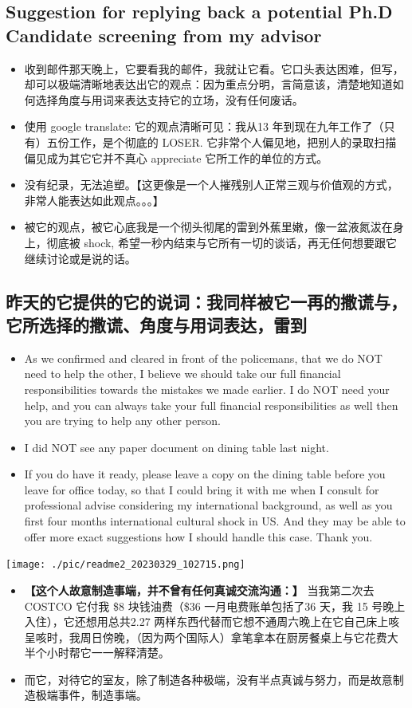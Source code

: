 \documentclass[9pt, b5paper]{article}
\begin{document}
\subsection{Suggestion for replying back a potential Ph.D Candidate screening from my advisor}
\label{sec-7-2}
\begin{itemize}
\item 收到邮件那天晚上，它要看我的邮件，我就让它看。它口头表达困难，但写，却可以极端清晰地表达出它的观点：因为重点分明，言简意该，清楚地知道如何选择角度与用词来表达支持它的立场，没有任何废话。
\item 使用 google translate: 它的观点清晰可见：我从13 年到现在九年工作了（只有）五份工作，是个彻底的 LOSER. 它非常个人偏见地，把别人的录取扫描偏见成为其它它并不真心 appreciate 它所工作的单位的方式。
\item 没有纪录，无法追塑。【这更像是一个人摧残别人正常三观与价值观的方式，非常人能表达如此观点。。。】
\item 被它的观点，被它心底我是一个彻头彻尾的雷到外蕉里嫩，像一盆液氮沷在身上，彻底被 shock, 希望一秒内结束与它所有一切的谈话，再无任何想要跟它继续讨论或是说的话。
\end{itemize}
\subsection{昨天的它提供的它的说词：我同样被它一再的撒谎与，它所选择的撒谎、角度与用词表达，雷到}
\label{sec-7-3}
\begin{itemize}
\item As we confirmed and cleared in front of the policemans, that we do NOT need to help the other, I believe we should take our full financial responsibilities towards the mistakes we made earlier. I do NOT need your help, and you can always take your full financial responsibilities as well then you are trying to help any other person.
\item I did NOT see any paper document on dining table last night.
\item If you do have it ready, please leave a copy on the dining table before you leave for office today, so that I could bring it with me when I consult for professional advise considering my international background, as well as you first four months international cultural shock in US. And they may be able to offer more exact suggestions how I should handle this case. Thank you.
\end{itemize}

\texttt{[image: ./pic/readme2\_20230329\_102715.png]}
\begin{itemize}
\item \textbf{【这个人故意制造事端，并不曾有任何真诚交流沟通：】} 当我第二次去COSTCO 它付我 \$8 块钱油费（\$36 一月电费账单包括了36 天，我 15 号晚上入住），它还想用总共2.27 两样东西代替而它想不通周六晚上在它自己床上咳呈咳时，我周日傍晚，（因为两个国际人）拿笔拿本在厨房餐桌上与它花费大半个小时帮它一一解释清楚。
\item 而它，对待它的室友，除了制造各种极端，没有半点真诚与努力，而是故意制造极端事件，制造事端。
\end{itemize}
\end{document}
